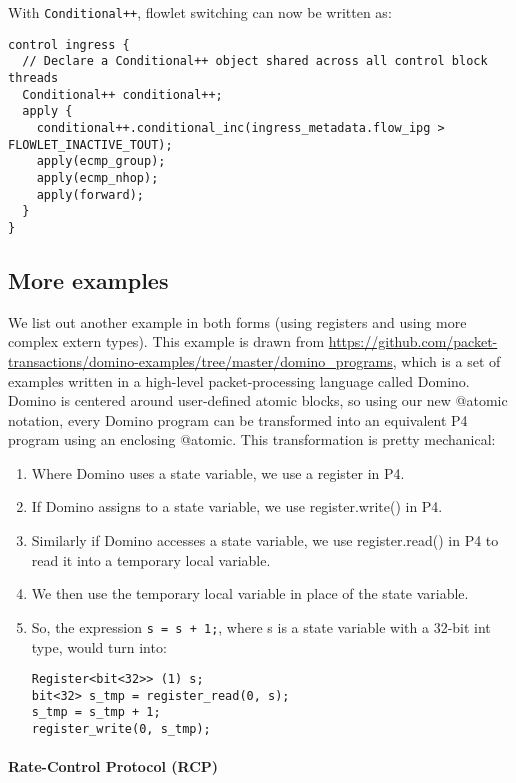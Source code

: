 With \texttt{Conditional++}, flowlet switching can now be written as:
\begin{verbatim}
control ingress {
  // Declare a Conditional++ object shared across all control block threads
  Conditional++ conditional++;
  apply {
    conditional++.conditional_inc(ingress_metadata.flow_ipg > FLOWLET_INACTIVE_TOUT);
    apply(ecmp_group);
    apply(ecmp_nhop);
    apply(forward);
  }
}
\end{verbatim}

\subsection{More examples}

We list out another example in both forms (using registers and using more
complex extern types). This example is drawn from
\url{https://github.com/packet-transactions/domino-examples/tree/master/domino_programs},
which is a set of examples written in a high-level packet-processing language
called Domino. Domino is centered around user-defined atomic blocks, so using
our new @atomic notation, every Domino program can be transformed into an
equivalent P4 program using an enclosing @atomic. This transformation is pretty
mechanical:
\begin{enumerate}
\item Where Domino uses a state variable, we use a register in P4.
\item If Domino assigns to a state variable, we use register.write() in P4.
\item Similarly if Domino accesses a state variable, we use register.read() in P4
to read it into a temporary local variable.
\item We then use the temporary local variable in place of the state variable.
\item So, the expression \texttt{s = s + 1;}, where s is a state variable with a 32-bit
int type, would
turn into:
\begin{verbatim}
Register<bit<32>> (1) s;
bit<32> s_tmp = register_read(0, s);
s_tmp = s_tmp + 1;
register_write(0, s_tmp);
\end{verbatim}

\end{enumerate}

\paragraph{Rate-Control Protocol (RCP)}

